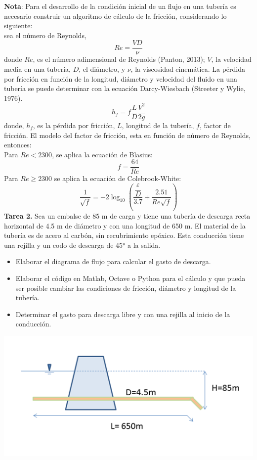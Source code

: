 \documentclass[letterpaper]{report}
\begin{document}
\begin{mdframed}[backgroundcolor=verdeclaro]
	\textbf{Nota}: Para el desarrollo de la condición inicial de un flujo en una tubería es necesario construir un algoritmo de cálculo de la fricción, considerando lo siguiente:\\
	sea el número de Reynolds,
	\begin{equation*}
		Re=\frac{VD}{\nu}
	\end{equation*} 
	donde $Re$, es el número adimensional de Reynolds (Panton, 2013); $V$, la velocidad media en una tubería, $D$, el diámetro, y $\nu$, la viscosidad cinemática.
	La pérdida por fricción en función de la longitud, diámetro y velocidad del fluido en una tubería se puede determinar con la ecuación Darcy-Wiesbach (Streeter y Wylie, 1976).
	\begin{equation*}
		h_f=f\dfrac{L}{D}\dfrac{V^2}{2g}
	\end{equation*}
	donde, $h_f$, es la pérdida por fricción, $L$, longitud de la tubería, $f$, factor de fricción.
	El modelo del factor de fricción, esta en función de número de Reynolds, entonces:\\
	Para $Re<2300$, se aplica la ecuación de Blasius:
	\begin{equation*}
		f=\dfrac{64}{Re}
	\end{equation*}
	Para $Re\geq2300$ se aplica la ecuación de Colebrook-White:
	\begin{equation*}
		\frac{1}{\sqrt f}=-2\log_{10}{\left(\frac{\dfrac{\varepsilon}{D}}{3.7}+\frac{2.51}{Re\sqrt f}\right)}
	\end{equation*} 
	\textbf{Tarea 2.} 
	Sea un embalse de 85 m de carga y tiene una tubería de descarga recta horizontal de 4.5 m de diámetro y con una longitud de 650 m. El material de la tubería es de acero al carbón, sin recubrimiento epóxico. Esta conducción tiene una rejilla y un codo de descarga de 45° a la salida.\bigskip
	\begin{itemize}
		\item Elaborar el diagrama de flujo para calcular el gasto de descarga.
		\item Elaborar el código en Matlab, Octave o Python para el cálculo y que pueda ser posible cambiar las condiciones de fricción, diámetro y longitud de la tubería.
		\item Determinar el gasto para descarga libre y con una rejilla al inicio de la conducción.
	\end{itemize}
	
	\includegraphics[width=0.7\linewidth]{figuras/tarea2}
	\label{fig:tarea2}\bigskip
	

\end{mdframed}
\end{document}
